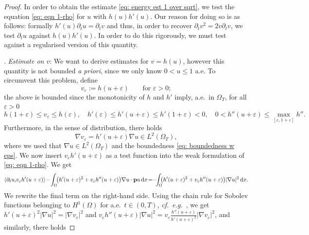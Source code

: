 \documentclass[11pt,a4paper,reqno]{amsart}
\theoremstyle{remark}
\theoremstyle{definition}
\numberwithin{equation}{section}
\newcommand{\p}{{\bf p}}
\renewcommand{\d}{\, \mathrm{d} }
\begin{document}
\begin{proof}
In order to obtain the estimate \eqref{eq: energy est 1 over sqrt}, we test the equation \eqref{eq: eqn 1-rho} for $u$ with $h(u) h'(u)$. Our reason for doing so is as follows: formally $h'(u)\partial_t u = \partial_t v$ and thus, in order to recover $\partial_t v^2 = 2 v \partial_t v$, we test $\partial_t u$ against $h(u) h'(u)$. In order to do this rigorously, we must test against a regularised version of this quantity. 

\smallskip 


. \textit{Estimate on $v$}: We want to derive estimates for $v = h(u)$, however this quantity is not bounded \emph{a priori}, since we only know $0 < u \leq 1$ a.e. To circumvent this problem, define 
\begin{equation*}
    v_\varepsilon := h({u+\varepsilon}) \qquad \text{for } \varepsilon>0; 
\end{equation*}
the above is bounded since the monotonicity of $h$ and $h'$ imply, a.e.~in $\Omega_T$, for all $\varepsilon>0$ 
\begin{equation}\label{eq: boundedness w eps}
  h(1+\varepsilon) \leq v_\varepsilon \leq h(\varepsilon), \quad h'(\varepsilon) \leq h'(u+\varepsilon) \leq h'(1+\varepsilon) < 0, \quad 0 < h''(u+\varepsilon) \leq \max_{[\varepsilon,1+\varepsilon]}h''. 
    \end{equation}
Furthermore, in the sense of distribution, there holds 
\begin{equation}\label{eq: expression nabla v}
    \nabla v_\varepsilon = h'(u+\varepsilon) \nabla u \in L^2(\Omega_T), 
\end{equation}
where we used that $\nabla u \in L^2(\Omega_T)$ and the boundedness \eqref{eq: boundedness w eps}. We now insert $v_\varepsilon h'(u+\varepsilon)$ as a test function into the weak formulation of \eqref{eq: eqn 1-rho}. We get 
\begin{equation*}
    \langle \partial_t u ,\! v_\varepsilon h'(u+\varepsilon)  \rangle \!-  \!\int_\Omega \!\!\big(h'(u+\varepsilon)^2 + v_\varepsilon h''(u+\varepsilon)\big)\nabla u \cdot  \p u \d x \!=\! \!-\!\!\int_\Omega \!\!\!\big(h'(u+\varepsilon)^2 + v_\varepsilon h''(u+\varepsilon)\big) |\nabla u|^2 \d x. 
\end{equation*}
We rewrite the final term on the right-hand side. Using the chain rule for Sobolev functions belonging to $H^1(\Omega)$ for a.e.~$t \in (0,T)$, \textit{cf.}~\textit{e.g.}~\cite[\S 5.10]{Evans}, we get $h'(u+\varepsilon)^2|\nabla u|^2 = |\nabla v_\varepsilon|^2$ and $v_\varepsilon h''(u+\varepsilon)|\nabla u|^2 = v_\varepsilon \frac{h''(u+\varepsilon)}{h'(u+\varepsilon)^2} |\nabla v_\varepsilon|^2$, and similarly, there holds 

\end{proof}
\end{document}
